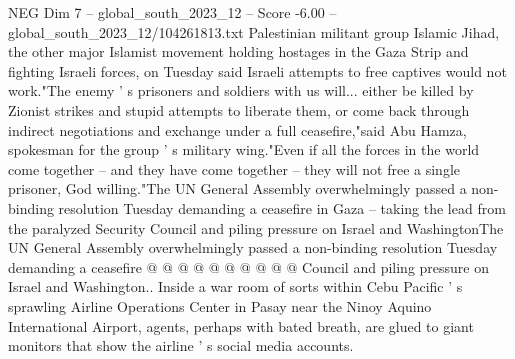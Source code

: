 \begin{textsample}{NEG Dim 7 – global\_south\_2023\_12 – Score -6.00 – global\_south\_2023\_12/104261813.txt}
Palestinian militant group Islamic Jihad, the other major Islamist movement holding hostages in the Gaza Strip and fighting Israeli forces, on Tuesday said Israeli attempts to free captives would not work."The enemy ' s prisoners and soldiers with us will... either be killed by Zionist strikes and stupid attempts to liberate them, or come back through indirect negotiations and exchange under a full ceasefire,"said Abu Hamza, spokesman for the group ' s military wing."Even if all the forces in the world come together -- and they have come together -- they will not free a single prisoner, God willing."The UN General Assembly overwhelmingly passed a non-binding resolution Tuesday demanding a ceasefire in Gaza -- taking the lead from the paralyzed Security Council and piling pressure on Israel and WashingtonThe UN General Assembly overwhelmingly passed a non-binding resolution Tuesday demanding a ceasefire @ @ @ @ @ @ @ @ @ @ Council and piling pressure on Israel and Washington..
Inside a war room of sorts within Cebu Pacific ' s sprawling Airline Operations Center in Pasay near the Ninoy Aquino International Airport, agents, perhaps with bated breath, are glued to giant monitors that show the airline ' s social media accounts.

\end{textsample}
